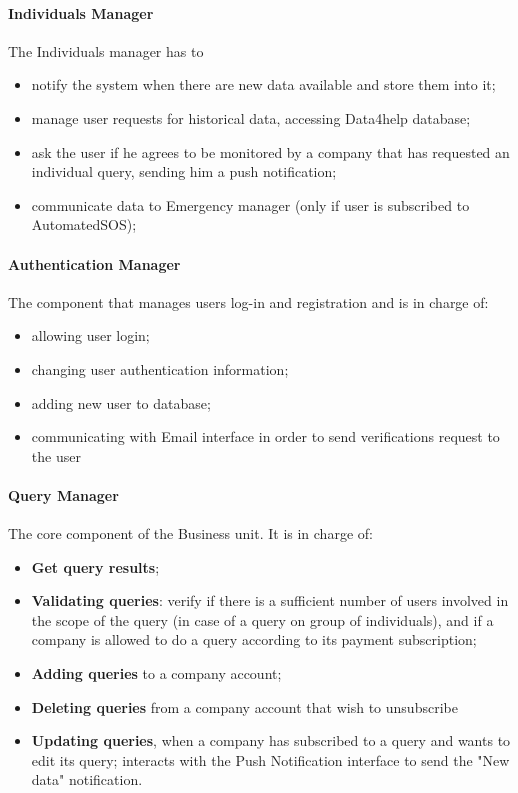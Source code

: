 \paragraph{Individuals Manager} \mbox{} \newline
The Individuals manager has to 
\begin{itemize}
    \item notify the system when there are new data available and store them into it;
    \item manage user requests for historical data, accessing Data4help database;
    \item ask the user if he agrees to be monitored by a company that has requested an individual query, sending him a push notification;
    \item communicate data to Emergency manager (only if user is subscribed to AutomatedSOS);
\end{itemize}


\paragraph{Authentication Manager} \mbox{} \newline
The component that manages users log-in and registration and is in charge of:
\begin{itemize}
    \item allowing user login;
    \item changing user authentication information;
    \item adding new user to database;
    \item communicating with Email interface in order to send verifications request to the user
\end{itemize}

\paragraph{Query Manager} \mbox{} \newline
The core component of the Business unit. It is in charge of:
\begin{itemize}
    \item \textbf{Get query results};
    \item \textbf{Validating queries}: verify if there is a sufficient number of users involved in the scope of the query (in case of a query on group of individuals), and if a company is allowed to do a query according to its payment subscription;
    \item \textbf{Adding queries} to a company account;
    \item \textbf{Deleting queries} from a company account that wish to unsubscribe
    \item \textbf{Updating queries}, when a company has subscribed to a query and wants to edit its query; interacts with the Push Notification interface to send the "New data" notification.
\end{itemize}

